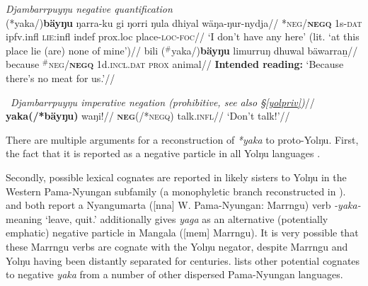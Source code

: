 \documentclass[usenames,dvipsnames,11pt]{article}
\begin{document}
{{\pex{} \textit{Djambarrpuyŋu negative quantification}\\
\a\begingl
	\gla (*yaka/)\textbf{bäyŋu} ŋarra-ku gi ŋorri ŋula dhiyal wäŋa-ŋur-nydja//
	\glb \textsc{*neg/\textbf{negq}} 1s\textsc{-dat} \gls{ipfv}.\gls{infl} \textsc{lie}:\gls{infl} \gls{indef} \gls{prox}.\gls{loc} place-\textsc{loc-foc}//
	\glft`I don't have any here' (lit. `at this place lie (are) none of mine')\hfill\citep[691]{Wilkinson1991}//
	\endgl
\a\begingl\gla bili ($^\#$yaka/)\textbf{bäyŋu} limurruŋ dhuwal bäwarraṉ//
\glb because \textsc{$^\#$neg/\textbf{negq}} 1d.\textsc{incl.dat} \textsc{prox} animal//
\glft\textbf{Intended reading:} `Because there's no meat for us.'//\endgl
\xe

\pex~\begingl\glpreamble\textit{Djambarrpuyŋu imperative negation (prohibitive, see also §\ref{yolpriv})}//
\gla \textbf{yaka(/*bäyŋu)} waŋi!//
\glb \textsc{\textbf{neg}(/*negq)} talk.\textsc{infl}//
\glft`Don't talk!'//\endgl\xe


There are multiple arguments for a reconstruction of \textit{*yaka} to proto-Yolŋu. First, the fact that it is reported as a negative particle in all Yolŋu languages \citep[31]{Schebeck2001}.

 Secondly, possible lexical cognates are reported in likely sisters to Yolŋu in the Western Pama-Nyungan subfamily (a monophyletic branch reconstructed in \citealt[838]{Bowern2012}). \citet[226]{Sharp2004} and \citet[67]{Ogrady1963} both report a Nyangumarta ([\gls{nna}] W. Pama-Nyungan: Marrngu) verb \textit{-yaka-} meaning `leave, quit.' \citet[35]{Mckelson1974} additionally gives \textit{yaga} as an alternative (potentially emphatic) negative particle in Mangala ([\gls{mem}] Marrngu). It is very possible that these Marrngu verbs are cognate with the Yolŋu negator, despite Marrngu and Yolŋu having been distantly separated for centuries. \citet[85]{Dixon2002a} lists other potential cognates to negative \textit{yaka} from a number of other dispersed Pama-Nyungan languages.
 
}}
\end{document}
